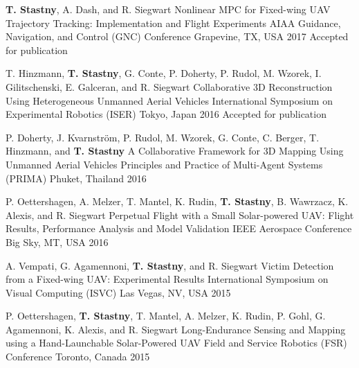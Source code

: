\begin{cventries}
\vspace{\acvSectionContentTopSkip}	
\raggedright
{}
	
  \cvpubentry	
	{\textbf{T. Stastny}, A. Dash, and R. Siegwart} %
	{Nonlinear MPC for Fixed-wing UAV Trajectory Tracking: Implementation and Flight Experiments} %
	{AIAA Guidance, Navigation, and Control (GNC) Conference} %
	{} %
	{} %
	{} %
	{Grapevine, TX, USA} %
	{2017} %
	{Accepted for publication} %
	
  \cvpubentry	
	{T. Hinzmann, \textbf{T. Stastny}, G. Conte, P. Doherty, P. Rudol, M. Wzorek, I. Gilitschenski, E. Galceran, and R. Siegwart} %
	{Collaborative 3D Reconstruction Using Heterogeneous Unmanned Aerial Vehicles} %
	{International Symposium on Experimental Robotics (ISER)} %
	{} %
	{} %
	{} %
	{Tokyo, Japan} %
	{2016} %
	{Accepted for publication} %
	
  \cvpubentry	
	{P. Doherty, J. Kvarnstr\"{o}m, P. Rudol, M. Wzorek, G. Conte, C. Berger, T. Hinzmann, and \textbf{T. Stastny}} %
	{A Collaborative Framework for 3D Mapping Using Unmanned Aerial Vehicles} %
	{Principles and Practice of Multi-Agent Systems (PRIMA)} %
	{} %
	{} %
	{} %
	{Phuket, Thailand} %
	{2016} %
	{} %
	
  \cvpubentry	
	{P. Oettershagen, A. Melzer, T. Mantel, K. Rudin, \textbf{T. Stastny}, B. Wawrzacz, K. Alexis, and R. Siegwart} %
	{Perpetual Flight with a Small Solar-powered UAV: Flight Results, Performance Analysis and Model Validation} %
	{IEEE Aerospace Conference} %
	{} %
	{} %
	{} %
	{Big Sky, MT, USA} %
	{2016} %
	{} %
	
  \cvpubentry	
	{A. Vempati, G. Agamennoni, \textbf{T. Stastny}, and R. Siegwart} %
	{Victim Detection from a Fixed-wing UAV: Experimental Results} %
	{International Symposium on Visual Computing (ISVC)} %
	{} %
	{} %
	{} %
	{Las Vegas, NV, USA} %
	{2015} %
	{} %
	
  \cvpubentry	
	{P. Oettershagen, \textbf{T. Stastny}, T. Mantel, A. Melzer, K. Rudin, P. Gohl, G. Agamennoni, K. Alexis, and R. Siegwart} %
	{Long-Endurance Sensing and Mapping using a Hand-Launchable Solar-Powered UAV} %
	{Field and Service Robotics (FSR) Conference} %
	{} %
	{} %
	{} %
	{Toronto, Canada} %
	{2015} %
	{} %


\end{cventries}
